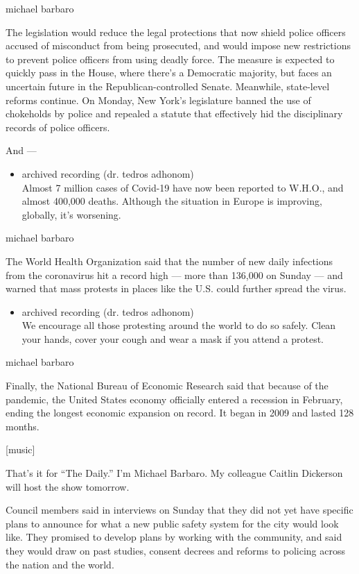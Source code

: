 michael barbaro

The legislation would reduce the legal protections that now shield
police officers accused of misconduct from being prosecuted, and would
impose new restrictions to prevent police officers from using deadly
force. The measure is expected to quickly pass in the House, where
there's a Democratic majority, but faces an uncertain future in the
Republican-controlled Senate. Meanwhile, state-level reforms continue.
On Monday, New York's legislature banned the use of chokeholds by police
and repealed a statute that effectively hid the disciplinary records of
police officers.

And ---

\begin{itemize}
\tightlist
\item
  archived recording (dr. tedros adhonom)\\
  Almost 7 million cases of Covid-19 have now been reported to W.H.O.,
  and almost 400,000 deaths. Although the situation in Europe is
  improving, globally, it's worsening.
\end{itemize}

michael barbaro

The World Health Organization said that the number of new daily
infections from the coronavirus hit a record high --- more than 136,000
on Sunday --- and warned that mass protests in places like the U.S.
could further spread the virus.

\begin{itemize}
\tightlist
\item
  archived recording (dr. tedros adhonom)\\
  We encourage all those protesting around the world to do so safely.
  Clean your hands, cover your cough and wear a mask if you attend a
  protest.
\end{itemize}

michael barbaro

Finally, the National Bureau of Economic Research said that because of
the pandemic, the United States economy officially entered a recession
in February, ending the longest economic expansion on record. It began
in 2009 and lasted 128 months.

{[}music{]}

That's it for ``The Daily.'' I'm Michael Barbaro. My colleague Caitlin
Dickerson will host the show tomorrow.

Council members said in interviews on Sunday that they did not yet have
specific plans to announce for what a new public safety system for the
city would look like. They promised to develop plans by working with the
community, and said they would draw on past studies, consent decrees and
reforms to policing across the nation and the world.

